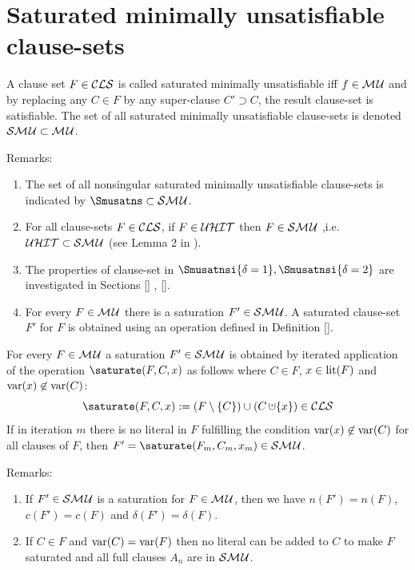 \documentclass{report}
\begin{document}
\section{Saturated minimally unsatisfiable clause-sets}
\label{sec:smu}

\begin{defi}\label{def:smu}
\cite{h9} A clause set $F \in \mathcal{CLS}$ is called saturated minimally unsatisfiable iff $f \in \mathcal{M\hspace{0.8pt}U} $ and by replacing any $C \in F$ by any super-clause $C' \supset C$, the result clause-set is satisfiable. The set of all saturated minimally unsatisfiable clause-sets is denoted $\mathcal{S}\mathcal{M\hspace{0.8pt}U} \subset \mathcal{M\hspace{0.8pt}U}$.
\end{defi}
Remarks:
  \begin{enumerate}
  \item The set of all nonsingular saturated minimally unsatisfiable clause-sets is indicated by $\Smusatns \subset \Smusat$.
  \item For all clause-sets $F \in \mathcal{CLS}$, if $F \in \mathcal{U}\mathcal{HIT}$ then $ F \in \mathcal{S}\mathcal{M\hspace{0.8pt}U}$ ,i.e. $\mathcal{U}\mathcal{HIT} \subset \mathcal{S}\mathcal{M\hspace{0.8pt}U}$ (see Lemma 2 in \cite{h29}). 
  \item The properties of clause-set in $\Smusatnsi{\delta=1}, \Smusatnsi{\delta=2}$ are investigated in Sections \ref{} , \ref{}.
  \item For every $F \in \mathcal{M\hspace{0.8pt}U}$ there is a saturation $F' \in \mathcal{S}\mathcal{M\hspace{0.8pt}U}$. A saturated clause-set  $F'$ for $F$ is obtained using an operation defined in Definition \ref{}.
  \end{enumerate}

\begin{defi}\label{def:smu-opr}
\cite{h29} For every $F \in \mathcal{M\hspace{0.8pt}U}$ a saturation $F' \in \mathcal{S}\mathcal{M\hspace{0.8pt}U}$ is obtained by iterated application of the operation $\saturate(F,C,x)$ as follows where $C \in F$, $x \in \operatorname{lit}(F)$ and $\operatorname{var}(x) \not \in \operatorname{var}(C)$:
  \begin{displaymath}
    \saturate(F,C,x) := (F \sm \set{C}) \cup (C \addcup \set{x}) \in \Cls
  \end{displaymath}
If in iteration $m$ there is no literal in $F$ fulfilling the condition $\operatorname{var}(x) \not \in \operatorname{var}(C)$ for all clauses of $F$, then $F' =\saturate(F_m,C_m,x_m) \in \Smusat$. 
\end{defi}
Remarks:
  \begin{enumerate}
  \item If $F' \in \mathcal{S}\mathcal{M\hspace{0.8pt}U}$ is a saturation for $F \in \mathcal{M\hspace{0.8pt}U}$, then we have $n(F')=n(F)$, $c(F')=c(F)$ and $\delta(F')=\delta(F)$.
  \item If $C \in F$ and $\operatorname{var}(C) = \operatorname{var}(F)$ then no literal can be added to $C$ to make $F$ saturated and all full clauses $A_n$ are in $\mathcal{S}\mathcal{M\hspace{0.8pt}U}$.
  \end{enumerate} 
  
\end{document}
